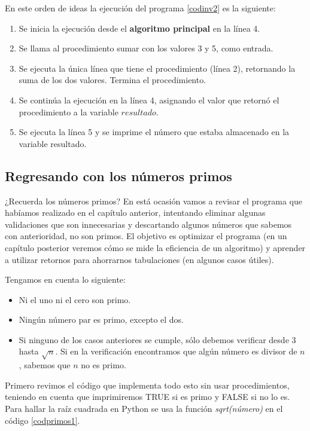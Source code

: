 En este orden de ideas la ejecución del programa \ref{codinv2} es la siguiente:

\begin{enumerate}
\item Se inicia la ejecución desde el \textbf{algoritmo principal} en la línea 4.
\item Se llama al procedimiento sumar con los valores 3 y 5, como entrada.
\item Se ejecuta la única línea que tiene el procedimiento (línea 2), retornando la suma de los dos valores. Termina el procedimiento.
\item Se continúa la ejecución en la línea 4, asignando el valor que retornó el procedimiento a la variable $resultado$.
\item Se ejecuta la línea 5 y se imprime el número que estaba almacenado en la variable resultado.
\end{enumerate}

\newpage
\subsection{Regresando con los números primos}

¿Recuerda los números primos? En está ocasión vamos a revisar el programa que habíamos realizado en el capítulo anterior, intentando eliminar algunas validaciones que son innecesarias y descartando algunos números que sabemos con anterioridad, no son primos. El objetivo es optimizar el programa (en un capítulo posterior veremos cómo se mide la eficiencia de un algoritmo) y aprender a utilizar retornos para ahorrarnos tabulaciones (en algunos casos útiles).

Tengamos en cuenta lo siguiente:

\begin{itemize}
	\item Ni el uno ni el cero son primo.
	\item Ningún número par es primo, excepto el dos. 
	\item Si ninguno de los casos anteriores se cumple, sólo debemos verificar desde 3 hasta $\sqrt{n}$. Si en la verificación encontramos que algún número es divisor de $n$, sabemos que $n$ no es primo.
\end{itemize}

Primero revimos el código que implementa todo esto sin usar procedimientos, teniendo en cuenta que imprimiremos TRUE si es primo y FALSE si no lo es. Para hallar la raíz cuadrada en Python se usa la función \emph{sqrt(número)} en el código \ref{codprimos1}. \\


